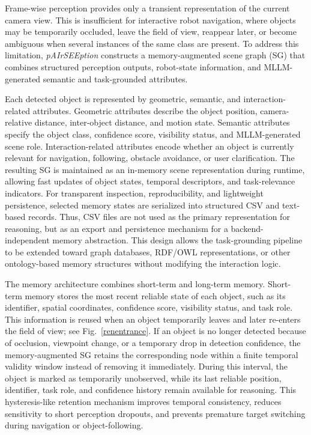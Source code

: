 \documentclass[lettersize,journal]{IEEEtran}
\begin{document}
Frame-wise perception provides only a transient representation of the current camera view. This is insufficient for interactive robot navigation, where objects may be temporarily occluded, leave the field of view, reappear later, or become ambiguous when several instances of the same class are present. To address this limitation, \textit{pAIrSEEption} constructs a memory-augmented scene graph (SG) that combines structured perception outputs, robot-state information, and MLLM-generated semantic and task-grounded attributes.

Each detected object is represented by geometric, semantic, and interaction-related attributes. Geometric attributes describe the object position, camera-relative distance, inter-object distance, and motion state. Semantic attributes specify the object class, confidence score, visibility status, and MLLM-generated scene role. Interaction-related attributes encode whether an object is currently relevant for navigation, following, obstacle avoidance, or user clarification. The resulting SG is maintained as an in-memory scene representation during runtime, allowing fast updates of object states, temporal descriptors, and task-relevance indicators. For transparent inspection, reproducibility, and lightweight persistence, selected memory states are serialized into structured CSV and text-based records. Thus, CSV files are not used as the primary representation for reasoning, but as an export and persistence mechanism for a backend-independent memory abstraction. This design allows the task-grounding pipeline to be extended toward graph databases, RDF/OWL representations, or other ontology-based memory structures without modifying the interaction logic.



The memory architecture combines short-term and long-term memory. Short-term memory stores the most recent reliable state of each object, such as its identifier, spatial coordinates, confidence score, visibility status, and task role. This information is reused when an object temporarily leaves and later re-enters the field of view; see Fig.~\ref{renentrance}. If an object is no longer detected because of occlusion, viewpoint change, or a temporary drop in detection confidence, the memory-augmented SG retains the corresponding node within a finite temporal validity window instead of removing it immediately. During this interval, the object is marked as temporarily unobserved, while its last reliable position, identifier, task role, and confidence history remain available for reasoning. This hysteresis-like retention mechanism improves temporal consistency, reduces sensitivity to short perception dropouts, and prevents premature target switching during navigation or object-following.
\end{document}
